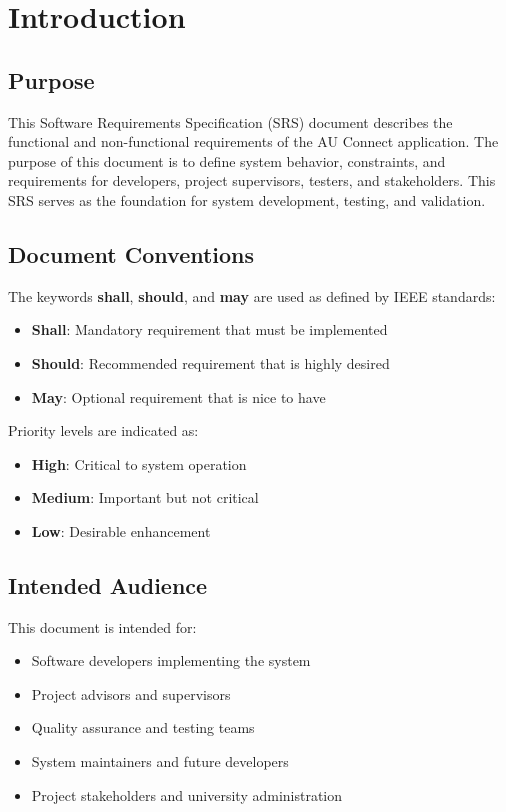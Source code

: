 \documentclass[12pt,a4paper]{article}
\begin{document}
\newpage

\section{Introduction}

\subsection{Purpose}
This Software Requirements Specification (SRS) document describes the functional and non-functional requirements of the AU Connect application. The purpose of this document is to define system behavior, constraints, and requirements for developers, project supervisors, testers, and stakeholders. This SRS serves as the foundation for system development, testing, and validation.

\subsection{Document Conventions}
The keywords \textbf{shall}, \textbf{should}, and \textbf{may} are used as defined by IEEE standards:
\begin{itemize}
    \item \textbf{Shall}: Mandatory requirement that must be implemented
    \item \textbf{Should}: Recommended requirement that is highly desired
    \item \textbf{May}: Optional requirement that is nice to have
\end{itemize}

Priority levels are indicated as:
\begin{itemize}
    \item \textbf{High}: Critical to system operation
    \item \textbf{Medium}: Important but not critical
    \item \textbf{Low}: Desirable enhancement
\end{itemize}

\subsection{Intended Audience}
This document is intended for:
\begin{itemize}
    \item Software developers implementing the system
    \item Project advisors and supervisors
    \item Quality assurance and testing teams
    \item System maintainers and future developers
    \item Project stakeholders and university administration
\end{itemize}
\end{document}

